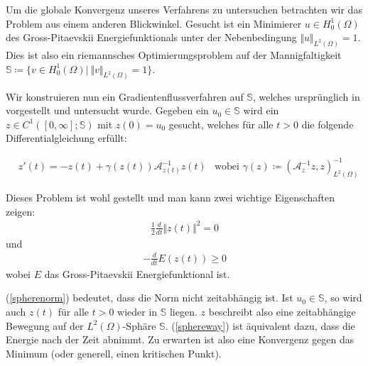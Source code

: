 \documentclass[final,bibliography=totocnumbered]{include/seminar}
\newcommand{\Ltwo}{\ensuremath{{L^2(\Omega)}}}
\newcommand{\Honez}{\ensuremath{{H^1_0(\Omega)}}}
\newcommand{\mAi}{\ensuremath{\mathcal{A}}^{-1}}
\newcommand{\GPEnergy}{Gross-Pitaevskii Energiefunktional}
\theoremstyle{break}
\begin{document}
Um die globale Konvergenz unseres Verfahrens zu untersuchen betrachten wir
das Problem aus einem anderen Blickwinkel. Gesucht ist ein Minimierer $u \in \Honez$
des \GPEnergy s unter der Nebenbedingung $\Vert u \Vert_\Ltwo = 1$.
Dies ist also ein riemannsches Optimierungsproblem auf der Mannigfaltigkeit
$\mathbb{S} \coloneq \{v \in \Honez\vert\: \Vert v \Vert_\Ltwo = 1\}$.

\medskip

Wir konstruieren nun ein Gradientenflussverfahren auf $\mathbb{S}$,
welches ursprünglich in \cite{flow} vorgestellt und untersucht wurde.
Gegeben ein $u_0 \in \mathbb{S}$ wird ein
$z \in C^1([0, \infty];\mathbb{S})$ mit $z(0) = u_0$ gesucht, welches
für alle $t > 0$ die folgende Differentialgleichung erfüllt:

\begin{align}
    &z'(t) = -z(t) + \gamma(z(t))\mAi_{z(t)}z(t)
    &\text{wobei } \gamma(z) \coloneqq (\mAi_zz, z)_\Ltwo^{-1}
\end{align}

Dieses Problem ist wohl gestellt und man kann zwei wichtige Eigenschaften zeigen:
\begin{align}\label{spherenorm}
    \frac{1}{2}\frac{d}{dt}\Vert z(t) \Vert^2 = 0
\end{align}
und
\begin{align}\label{sphereway}
    - \frac{d}{dt}E(z(t)) \geq 0
\end{align}
wobei $E$ das {\GPEnergy} ist.

\medskip

(\ref{spherenorm}) bedeutet, dass die Norm nicht zeitabhängig ist. Ist $u_0 \in \mathbb{S}$, so
wird auch $z(t)$ für alle $t > 0$ wieder in $\mathbb{S}$ liegen.
$z$ beschreibt also eine zeitabhängige Bewegung auf der $\Ltwo$-Sphäre $\mathbb{S}$.
(\ref{sphereway}) ist äquivalent dazu, dass die Energie nach der Zeit abnimmt. Zu erwarten
ist also eine Konvergenz gegen das Minimum (oder generell, einen kritischen Punkt).

\def\myr{3}
\end{document}
